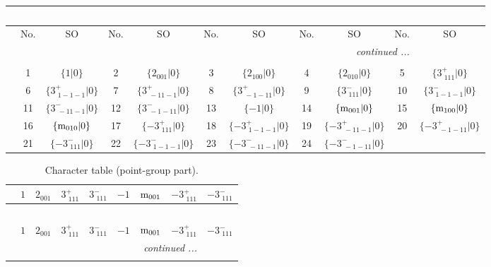 \documentclass[fleqn,10pt,landscape]{article}
\begin{document}
\begin{itemize}
\begin{center}
\begin{longtable}{c|cc|cc|cc|cc|cc}
\multicolumn{10}{l}{\tablename\ \thetable{}} \\
 \hline \hline
 & No. & SO & No. & SO & No. & SO & No. & SO & No. & SO \\ \hline \endhead

 \hline \hline
\multicolumn{10}{r}{\footnotesize\it continued ...} \\ \endfoot

 \hline \hline
\multicolumn{10}{r}{} \\ \endlastfoot

 & 1 & $\{1|0\}$ & 2 & $\{2{}_{001}|0\}$ & 3 & $\{2{}_{100}|0\}$ & 4 & $\{2{}_{010}|0\}$ & 5 & $\{3^{+}_{\,\,111}|0\}$ \\
& 6 & $\{3^{+}_{\,\,1-1-1}|0\}$ & 7 & $\{3^{+}_{\,\,-11-1}|0\}$ & 8 & $\{3^{+}_{\,\,-1-11}|0\}$ & 9 & $\{3^{-}_{\,\,111}|0\}$ & 10 & $\{3^{-}_{\,\,1-1-1}|0\}$ \\
& 11 & $\{3^{-}_{\,\,-11-1}|0\}$ & 12 & $\{3^{-}_{\,\,-1-11}|0\}$ & 13 & $\{-1|0\}$ & 14 & $\{{\rm m}_{001}|0\}$ & 15 & $\{{\rm m}_{100}|0\}$ \\
& 16 & $\{{\rm m}_{010}|0\}$ & 17 & $\{-3^{+}_{\,\,111}|0\}$ & 18 & $\{-3^{+}_{\,\,1-1-1}|0\}$ & 19 & $\{-3^{+}_{\,\,-11-1}|0\}$ & 20 & $\{-3^{+}_{\,\,-1-11}|0\}$ \\
& 21 & $\{-3^{-}_{\,\,111}|0\}$ & 22 & $\{-3^{-}_{\,\,1-1-1}|0\}$ & 23 & $\{-3^{-}_{\,\,-11-1}|0\}$ & 24 & $\{-3^{-}_{\,\,-1-11}|0\}$ &  &  \\
\end{longtable}
\end{center}
\begin{center}
\renewcommand{\arraystretch}{1.0}
\begin{longtable}{c|rrrrrrrr}
\caption{Character table (point-group part).}
 \\
 \hline \hline
 & $ 1 $ & $ 2{}_{001} $ & $ 3^{+}_{\,\,111} $ & $ 3^{-}_{\,\,111} $ & $ -1 $ & $ {\rm m}_{001} $ & $ -3^{+}_{\,\,111} $ & $ -3^{-}_{\,\,111} $ \\ \hline \endfirsthead

\multicolumn{8}{l}{\tablename\ \thetable{}} \\
 \hline \hline
 & $ 1 $ & $ 2{}_{001} $ & $ 3^{+}_{\,\,111} $ & $ 3^{-}_{\,\,111} $ & $ -1 $ & $ {\rm m}_{001} $ & $ -3^{+}_{\,\,111} $ & $ -3^{-}_{\,\,111} $ \\ \hline \endhead

 \hline \hline
\multicolumn{8}{r}{\footnotesize\it continued ...} \\ \endfoot


\end{longtable}
\end{center}
\end{itemize}
\end{document}
